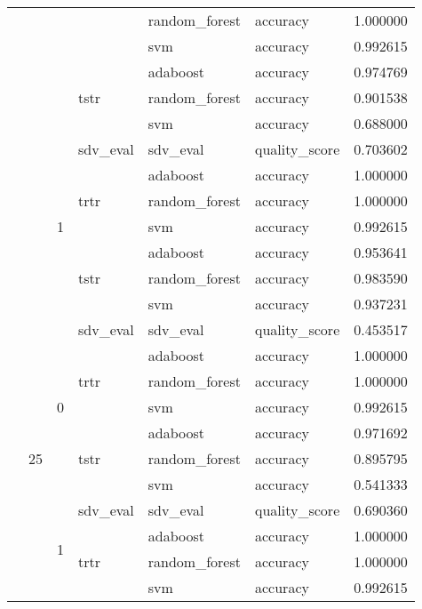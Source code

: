 \begin{longtable}{llllllr}
\cline{5-7}
 &  &  &  & random_forest & accuracy & 1.000000 \\
\cline{5-7}
 &  &  &  & svm & accuracy & 0.992615 \\
\cline{4-7} \cline{5-7}
 &  &  & \multirow[t]{3}{*}{tstr} & adaboost & accuracy & 0.974769 \\
\cline{5-7}
 &  &  &  & random_forest & accuracy & 0.901538 \\
\cline{5-7}
 &  &  &  & svm & accuracy & 0.688000 \\
\cline{3-7} \cline{4-7} \cline{5-7}
 &  & \multirow[t]{7}{*}{1} & sdv_eval & sdv_eval & quality_score & 0.703602 \\
\cline{4-7} \cline{5-7}
 &  &  & \multirow[t]{3}{*}{trtr} & adaboost & accuracy & 1.000000 \\
\cline{5-7}
 &  &  &  & random_forest & accuracy & 1.000000 \\
\cline{5-7}
 &  &  &  & svm & accuracy & 0.992615 \\
\cline{4-7} \cline{5-7}
 &  &  & \multirow[t]{3}{*}{tstr} & adaboost & accuracy & 0.953641 \\
\cline{5-7}
 &  &  &  & random_forest & accuracy & 0.983590 \\
\cline{5-7}
 &  &  &  & svm & accuracy & 0.937231 \\
\cline{2-7} \cline{3-7} \cline{4-7} \cline{5-7}
 & \multirow[t]{14}{*}{25} & \multirow[t]{7}{*}{0} & sdv_eval & sdv_eval & quality_score & 0.453517 \\
\cline{4-7} \cline{5-7}
 &  &  & \multirow[t]{3}{*}{trtr} & adaboost & accuracy & 1.000000 \\
\cline{5-7}
 &  &  &  & random_forest & accuracy & 1.000000 \\
\cline{5-7}
 &  &  &  & svm & accuracy & 0.992615 \\
\cline{4-7} \cline{5-7}
 &  &  & \multirow[t]{3}{*}{tstr} & adaboost & accuracy & 0.971692 \\
\cline{5-7}
 &  &  &  & random_forest & accuracy & 0.895795 \\
\cline{5-7}
 &  &  &  & svm & accuracy & 0.541333 \\
\cline{3-7} \cline{4-7} \cline{5-7}
 &  & \multirow[t]{7}{*}{1} & sdv_eval & sdv_eval & quality_score & 0.690360 \\
\cline{4-7} \cline{5-7}
 &  &  & \multirow[t]{3}{*}{trtr} & adaboost & accuracy & 1.000000 \\
\cline{5-7}
 &  &  &  & random_forest & accuracy & 1.000000 \\
\cline{5-7}
 &  &  &  & svm & accuracy & 0.992615 \\

\end{longtable}

